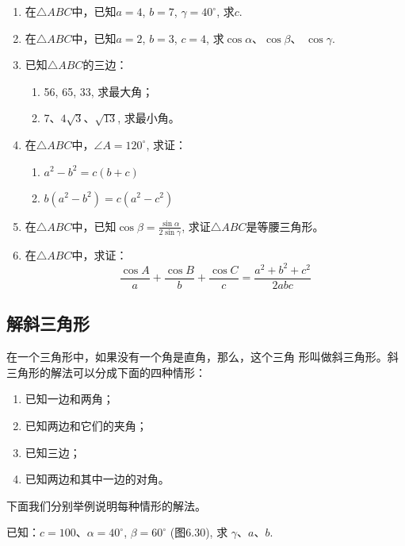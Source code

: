 \begin{ex}
\begin{enumerate}
    \item 在$\triangle ABC$中，已知$a=4$, $b=7$, $\gamma=40^{\circ}$, 求$c$.
    \item 在$\triangle ABC$中，已知$a=2$, $b=3$, $c=4$, 求$\cos\alpha$、$\cos\beta$、
    $\cos\gamma$.
    \item 已知$\triangle ABC$的三边：
\begin{enumerate}
    \item 56, 65, 33, 求最大角；
    \item 7、$4\sqrt{3}$、$\sqrt{13}$, 求最小角。
\end{enumerate}

    \item 在$\triangle ABC$中，$\angle A=120^{\circ}$, 求证：
\begin{enumerate}
    \item $a^2-b^2=c(b+c)$
    \item $ b(a^2-b^2)=c(a^2-c^2)$
\end{enumerate}

\item  在$\triangle ABC$中，已知$\cos\beta=\frac{\sin\alpha}{2\sin\gamma}$, 求证$\triangle ABC$是等腰三角形。
\item  在$\triangle ABC$中，求证：
\[\frac{\cos A}{a}+\frac{\cos B}{b}+\frac{\cos C}{c}=\frac{a^2+b^2+c^2}{2abc}\]
\end{enumerate}    
\end{ex}

\subsection{解斜三角形}
在一个三角形中，如果没有一个角是直角，那么，这个三角
形叫做斜三角形。斜三角形的解法可以分成下面的四种情形：
\begin{enumerate}
\item 已知一边和两角；
\item 已知两边和它们的夹角；
\item 已知三边；
\item 已知两边和其中一边的对角。
\end{enumerate}

下面我们分别举例说明每种情形的解法。
    
\begin{example}
    已知：$c=100$、$\alpha=40^{\circ}$, $\beta=60^{\circ}$ (图6.30), 求
$\gamma$、$a$、$b$.
\end{example}

